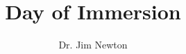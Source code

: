 \documentclass[14pt]{extarticle}
\title{Day of Immersion}
\author{Dr. Jim Newton}
\begin{document}
\maketitle

\pagebreak
\pagebreak
\pagebreak
\pagebreak
\pagebreak
\pagebreak
\pagebreak

\end{document}
